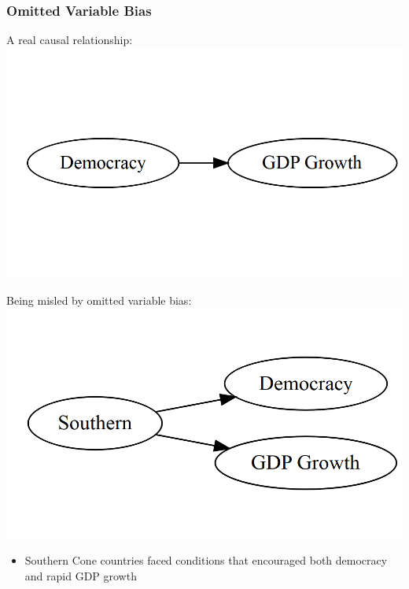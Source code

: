 \documentclass[xcolor=x11names,compress]{beamer}\usepackage[]{graphicx}\usepackage[]{color}
\makeatletter
\def\maxwidth{ %
  \ifdim\Gin@nat@width>\linewidth
    \linewidth
  \else
    \Gin@nat@width
  \fi
}
\newenvironment{knitrout}{}{} %
\renewcommand{\(}{\begin{columns}}
\renewcommand{\)}{\end{columns}}
\newcommand{\<}[1]{\begin{column}{#1}}
\renewcommand{\>}{\end{column}}
\makeatother
\begin{document}
\begin{frame}
\frametitle{Omitted Variable Bias}
\begin{multicols}{2}
A real causal relationship:
\begin{knitrout}
\color{fgcolor}
\includegraphics[width=\maxwidth]{figure/explanation9-1} 

\end{knitrout}
\columnbreak
Being misled by omitted variable bias:
\begin{knitrout}
\color{fgcolor}
\includegraphics[width=\maxwidth]{figure/explanation10-1} 

\end{knitrout}
\end{multicols}
\begin{itemize}
\pause
\item Southern Cone countries faced conditions that encouraged both democracy and rapid GDP growth
\end{itemize}
\end{frame}
\end{document}
